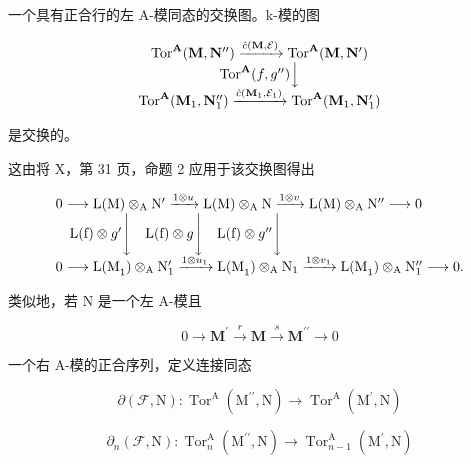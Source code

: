 一个具有正合行的左 A-模同态的交换图。k-模的图

\[
\begin{array}{c} \operatorname{Tor} ^ {\mathbf {A}} (\mathbf {M}, \mathbf {N} ^ {\prime \prime}) \xrightarrow {\hat {c} (\mathbf {M} , \mathcal {E})} \operatorname{Tor} ^ {\mathbf {A}} (\mathbf {M}, \mathbf {N} ^ {\prime}) \\ \operatorname{Tor} ^ {\mathbf {A}} (f, g ^ {\prime \prime}) \Big \downarrow \\ \operatorname{Tor} ^ {\mathbf {A}} (\mathbf {M} _ {1}, \mathbf {N} _ {1} ^ {\prime \prime}) \xrightarrow {\hat {c} (\mathbf {M} _ {1} , \mathcal {E} _ {1})} \operatorname{Tor} ^ {\mathbf {A}} (\mathbf {M} _ {1}, \mathbf {N} _ {1} ^ {\prime}) \end{array}
\]

是交换的。

这由将 X，第 31 页，命题 2 应用于该交换图得出

\[
\begin{array}{l} 0 \longrightarrow \mathrm{L(M)} \otimes_ {\mathrm{A}} \mathrm{N} ^ {\prime} \xrightarrow {1 \otimes u} \mathrm{L(M)} \otimes_ {\mathrm{A}} \mathrm{N} \xrightarrow {1 \otimes v} \mathrm{L(M)} \otimes_ {\mathrm{A}} \mathrm{N} ^ {\prime \prime} \longrightarrow 0 \\ \quad \mathrm{L(f)} \otimes g ^ {\prime} \Biggl \downarrow \quad \mathrm{L(f)} \otimes g \Biggl \downarrow \quad \mathrm{L(f)} \otimes g ^ {\prime \prime} \Biggl \downarrow \\ 0 \longrightarrow \mathrm{L(M} _ {1}) \otimes_ {\mathrm{A}} \mathrm{N} _ {1} ^ {\prime} \xrightarrow {1 \otimes u _ {1}} \mathrm{L(M} _ {1}) \otimes_ {\mathrm{A}} \mathrm{N} _ {1} \xrightarrow {1 \otimes v _ {1}} \mathrm{L(M} _ {1}) \otimes_ {\mathrm{A}} \mathrm{N} _ {1} ^ {\prime \prime} \longrightarrow 0. \end{array}
\]

类似地，若 N 是一个左 A-模且

\[
0 \to \mathbf {M} ^ {\prime} \xrightarrow {r} \mathbf {M} \xrightarrow {s} \mathbf {M} ^ {\prime \prime} \to 0\tag{F}
\]

一个右 A-模的正合序列，定义连接同态

\[
\partial (\mathcal {F}, \mathrm{N}): \operatorname{Tor} ^ {\mathrm{A}} \left(\mathrm{M} ^ {\prime \prime}, \mathrm{N}\right)\rightarrow \operatorname{Tor} ^ {\mathrm{A}} \left(\mathrm{M} ^ {\prime}, \mathrm{N}\right)
\]

\[
\partial_ {n} (\mathcal {F}, \mathrm{N}): \operatorname{Tor} _ {n} ^ {\mathrm{A}} \left(\mathrm{M} ^ {\prime \prime}, \mathrm{N}\right)\rightarrow \operatorname{Tor} _ {n - 1} ^ {\mathrm{A}} \left(\mathrm{M} ^ {\prime}, \mathrm{N}\right)
\]

